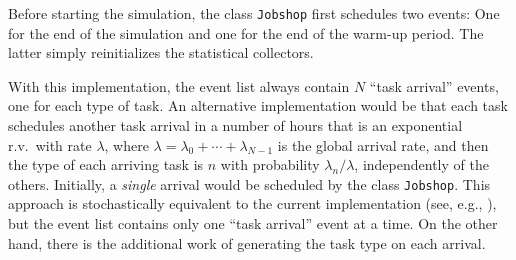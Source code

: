 Before starting the simulation, the class \texttt{Jobshop} first
schedules two events: One for the end of the simulation and one
for the end of the warm-up period.  The latter simply reinitializes
the statistical collectors.

With this implementation, the event list always
contain $N$ ``task arrival'' events, one for each type of task.
An alternative implementation would be that each task schedules
another task arrival in a number of hours that is an exponential r.v.\
with rate $\lambda$, where $\lambda = \lambda_0 + \cdots + \lambda_{N-1}$
is the global arrival rate, and then the type of each arriving task is 
$n$ with probability $\lambda_n/\lambda$, independently of the others.
Initially, a {\em single\/} arrival would be scheduled by the class
\texttt{Jobshop}.
This approach is stochastically equivalent to the current implementation
(see, e.g., \cite{sBRA87a,pWOL89a}), but the event list contains only
one ``task arrival'' event at a time.
On the other hand, there is the additional work of generating the task
type on each arrival.


